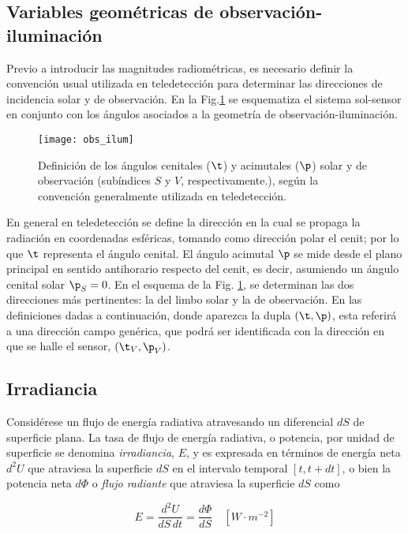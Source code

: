 \subsection{Variables geométricas de observación-iluminación}
Previo a introducir las magnitudes radiométricas, es necesario definir la convención usual utilizada en teledetección para determinar las direcciones de incidencia solar y de observación.
En la Fig.\ref{fig:obs_ilum} se esquematiza el sistema sol-sensor en conjunto con los ángulos asociados a la geometría de observación-iluminación.
 
\begin{figure}
\centering
\texttt{[image: obs\_ilum]}
\caption[Geometría de observación-iluminación]{Definición de los ángulos cenitales ($\t$) y acimutales ($\p$) solar y de observación (subíndices $S$ y $V$, respectivamente.),
según la convención generalmente utilizada en teledetección.} 
\label{fig:obs_ilum}
\end{figure}

En general en teledetección se define la dirección en la cual se propaga la radiación en coordenadas
esféricas, tomando como dirección polar el cenit; por lo que $\t$ representa el ángulo cenital. El ángulo acimutal $\p$ se mide desde el plano principal en sentido antihorario respecto del cenit,
es decir, asumiendo un ángulo cenital solar $\p_{S}=0$. En el esquema de la Fig. \ref{fig:obs_ilum},
se determinan las dos direcciones más pertinentes: la del limbo solar y la de observación. En las
definiciones dadas a continuación, donde aparezca la dupla $(\t,\p)$, esta referirá a una dirección
campo genérica, que podrá ser identificada con la dirección en que se halle el sensor, $(\t_{V},\p_{V})$.

\subsection{Irradiancia}
Considérese un flujo de energía radiativa atravesando un diferencial $dS$ de
superficie plana. La tasa de flujo de energía radiativa, o potencia,
por unidad de superficie se denomina
\textit{irradiancia}, $E$, y es expresada en términos de energía neta
$d^{2}U$ que atraviesa la superficie $dS$ en el intervalo temporal $[t,t+dt]$, o bien
la potencia neta $d\Phi$ o \textit{flujo radiante} que atraviesa la superficie $dS$ como

\begin{equation}
 E=\frac{d^{2} U}{dS\,dt}=\frac{d\Phi}{dS}\quad [W \cdot m^{-2}]
\label{irradiancia}
\end{equation}

